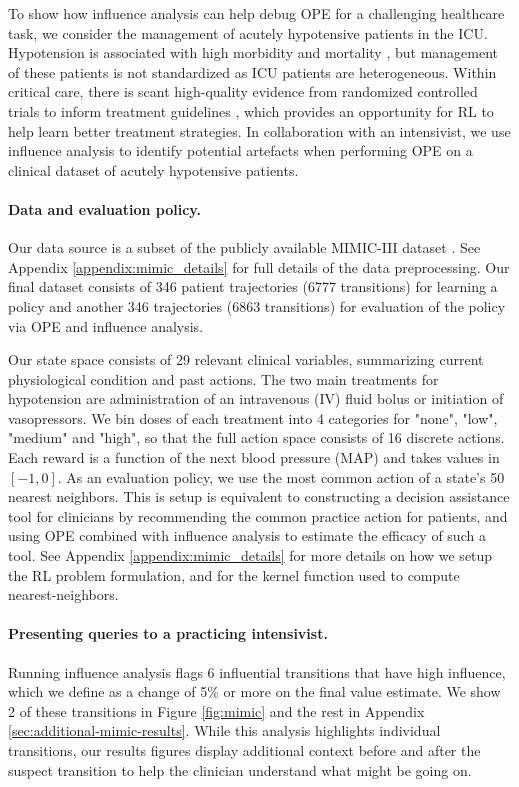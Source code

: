 \documentclass{article}
\begin{document}
To show how influence analysis can help debug OPE for a challenging healthcare task, we consider the management of acutely hypotensive patients in the ICU. Hypotension is associated with high morbidity and mortality \citep{jones2006emergency}, but management of these patients is not standardized as ICU patients are heterogeneous. Within critical care, there is scant high-quality evidence from randomized controlled trials to inform treatment guidelines \citep{de2018unexplained,girbes2019time}, which provides an opportunity for RL to help learn better treatment strategies. In collaboration with an intensivist, we use influence analysis to identify potential artefacts when performing OPE on a clinical dataset of acutely hypotensive patients. 

\paragraph{Data and evaluation policy.}
Our data source is a subset of the publicly available MIMIC-III dataset \citep{johnson2016mimic}. See Appendix \ref{appendix:mimic_details} for full details of the data preprocessing. Our final dataset consists of 346 patient trajectories (6777 transitions) for learning a policy and another 346 trajectories (6863 transitions) for evaluation of the policy via OPE and influence analysis. 

Our state space consists of 29 relevant clinical variables, summarizing current physiological condition and past actions. The two main treatments for hypotension are administration of an intravenous (IV) fluid bolus or initiation of vasopressors. We bin doses of each treatment into 4 categories for "none", "low", "medium" and "high", so that the full action space consists of 16 discrete actions. Each reward is a function of the next blood pressure (MAP) and takes values in $[-1,0]$. As an evaluation policy, we use the most common action of a state's 50 nearest neighbors. This is setup is equivalent to constructing a decision assistance tool for clinicians by recommending the common practice action for patients, and using OPE combined with influence analysis to estimate the efficacy of such a tool. See Appendix \ref{appendix:mimic_details} for more details on how we setup the RL problem formulation, and for the kernel function used to compute nearest-neighbors. 

\paragraph{Presenting queries to a practicing intensivist.}
Running influence analysis flags 6 influential transitions that have high influence, which we define as a change of 5\% or more on the final value estimate. We show 2 of these transitions in Figure \ref{fig:mimic} and the rest in Appendix \ref{sec:additional-mimic-results}. While this analysis highlights individual transitions, our results figures display additional context before and after the suspect transition to help the clinician understand what might be going on.
\end{document}
